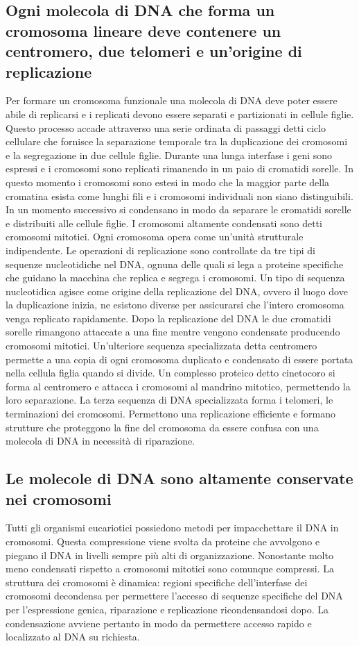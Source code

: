 \subsection{Ogni molecola di DNA che forma un cromosoma lineare deve contenere un centromero, due telomeri e un'origine di replicazione}
Per formare un cromosoma funzionale una molecola di DNA deve poter essere abile di replicarsi e i replicati devono essere separati e partizionati in cellule figlie. Questo processo 
accade attraverso una serie ordinata di passaggi detti ciclo cellulare che fornisce la separazione temporale tra la duplicazione dei cromosomi e la segregazione in due cellule figlie. 
Durante una lunga interfase i geni sono espressi e i cromosomi sono replicati rimanendo in un paio di cromatidi sorelle. In questo momento i cromosomi sono estesi in modo che la maggior
parte della cromatina esista come lunghi fili e i cromosomi individuali non siano distinguibili. In un momento successivo si condensano in modo da separare le cromatidi sorelle e 
distribuiti alle cellule figlie. I cromosomi altamente condensati sono detti cromosomi mitotici. Ogni cromosoma opera come un'unit\`a strutturale indipendente. Le operazioni di 
replicazione sono controllate da tre tipi di sequenze nucleotidiche nel DNA, ognuna delle quali si lega a proteine specifiche che guidano la macchina che replica e segrega i cromosomi.
Un tipo di sequenza nucleotidica agisce come origine della replicazione del DNA, ovvero il luogo dove la duplicazione inizia, ne esistono diverse per assicurarsi che l'intero cromosoma
venga replicato rapidamente. Dopo la replicazione del DNA le due cromatidi sorelle rimangono attaccate a una fine mentre vengono condensate producendo cromosomi mitotici. Un'ulteriore
sequenza specializzata detta centromero permette a una copia di ogni cromosoma duplicato e condensato di essere portata nella cellula figlia quando si divide. Un complesso proteico detto
cinetocoro si forma al centromero e attacca i cromosomi al mandrino mitotico, permettendo la loro separazione. La terza sequenza di DNA specializzata forma i telomeri, le terminazioni 
dei cromosomi. Permettono una replicazione efficiente e formano strutture che proteggono la fine del cromosoma da essere confusa con una molecola di DNA in necessit\`a di riparazione.
\subsection{Le molecole di DNA sono altamente conservate nei cromosomi}
Tutti gli organismi eucariotici possiedono metodi per impacchettare il DNA in cromosomi. Questa compressione viene svolta da proteine che avvolgono e piegano il DNA in livelli sempre 
pi\`u alti di organizzazione. Nonostante molto meno condensati rispetto a cromosomi mitotici sono comunque compressi. La struttura dei cromosomi \`e dinamica: regioni specifiche 
dell'interfase dei cromosomi decondensa per permettere l'accesso di sequenze specifiche del DNA per l'espressione genica, riparazione e replicazione ricondensandosi dopo. La 
condensazione avviene pertanto in modo da permettere accesso rapido e localizzato al DNA su richiesta.

